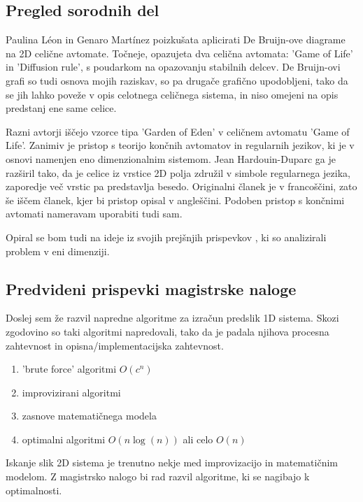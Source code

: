 \documentclass[a4paper, 12pt]{article}
\begin{document}
\subsection{Pregled sorodnih del}

Paulina Léon in Genaro Martínez \cite{PaulinaGenaro2016} poizkušata aplicirati
De Bruijn-ove diagrame na 2D celične avtomate. Točneje, opazujeta dva celična avtomata:
'Game of Life' in 'Diffusion rule', s poudarkom na opazovanju stabilnih delcev.
De Bruijn-ovi grafi so tudi osnova mojih raziskav, so pa drugače grafično upodobljeni,
tako da se jih lahko poveže v opis celotnega celičnega sistema, in niso omejeni na
opis predstanj ene same celice.

Razni avtorji \cite{Hartman2013} iščejo vzorce tipa 'Garden of Eden' v celičnem avtomatu 'Game of Life'.
Zanimiv je pristop s teorijo končnih avtomatov in regularnih jezikov, ki je v
osnovi namenjen eno dimenzionalnim sistemom. Jean Hardouin-Duparc ga je razširil
tako, da je celice iz vrstice 2D polja združil v simbole regularnega jezika, zaporedje več
vrstic pa predstavlja besedo. Originalni članek je v francoščini, zato še iščem članek,
kjer bi pristop opisal v angleščini. Podoben pristop s končnimi avtomati nameravam uporabiti tudi sam.

Opiral se bom tudi na ideje iz svojih prejšnjih prispevkov \cite{JerasDobnikar2007}
\cite{DBLP:conf/iccS/JerasD06} \cite{DBLP:conf/automata/Jeras08},
ki so analizirali problem v eni dimenziji.

\subsection{Predvideni prispevki magistrske naloge}

Doslej sem že razvil napredne algoritme za izračun predslik 1D sistema.
Skozi zgodovino so taki algoritmi napredovali, tako da je padala njihova
procesna zahtevnost in opisna/implementacijska zahtevnost.
\begin{enumerate}
\item 'brute force' algoritmi \( O(c^n) \)
\item improvizirani algoritmi
\item zasnove matematičnega modela
\item optimalni algoritmi \( O(n \log(n)) \) ali celo \( O(n) \)
\end{enumerate}
Iskanje slik 2D sistema je trenutno nekje med improvizacijo in matematičnim modelom.
Z magistrsko nalogo bi rad razvil algoritme, ki se nagibajo k optimalnosti.
\end{document}
